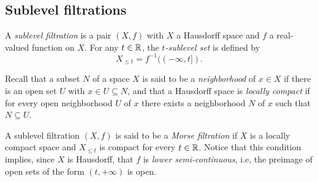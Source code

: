 
\subsection{Sublevel filtrations}

A \textit{sublevel filtration} is a pair $(X, f)$ with $X$ a Hausdorff space and $f$ a real-valued function on $X$.
For any $t \in \mathbb{R}$, the \textit{$t$-sublevel set} is defined by 
\begin{equation*}
X_{\leq t} = f^{-1}((-\infty, t]).
\end{equation*}

Recall that a subset $N$ of a space $X$ is said to be a \textit{neighborhood} of $x \in X$ if there is an open set $U$ with $x \in U \subseteq N$, and that a Hausdorff space is \textit{locally compact} if for every open neighborhood $U$ of $x$ there exists a neighborhood $N$ of $x$ such that $N \subseteq U$.

A sublevel filtration $(X, f)$ is said to be a \textit{Morse filtration} if $X$ is a locally compact space and $X_{\leq t}$ is compact for every $t \in \mathbb{R}$.
Notice that this condition implies, since $X$ is Hausdorff, that $f$ is \textit{lower semi-continuous}, i.e, the preimage of open sets of the form $(t, +\infty)$ is open.
